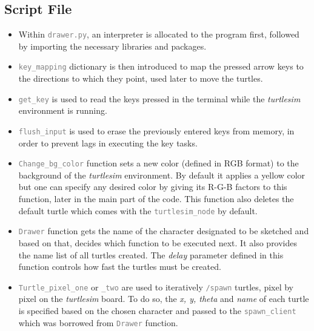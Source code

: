 \documentclass[conference]{IEEEtran}
\newcommand{\command}[1]{\textcolor{gray}{\footnotesize \texttt{#1}}}
\begin{document}
\subsection{Script File}
\begin{itemize}
    \item Within \command{drawer.py}, an interpreter is allocated to the program first, followed by importing the necessary libraries and packages.
    \item \command{key\_mapping} dictionary is then introduced to map the pressed arrow keys to the directions to which they point, used later to move the turtles.
    \item \command{get\_key} is used to read the keys pressed in the terminal while the \textit{turtlesim} environment is running.
    \item \command{flush\_input} is used to erase the previously entered keys from memory, in order to prevent lags in executing the key tasks.
    \item \command{Change\_bg\_color} function sets a new color (defined in RGB format) to the background of the \textit{turtlesim} environment. By default it applies a yellow color but one can specify any desired color by giving its R-G-B factors to this function, later in the main part of the code. This function also deletes the default turtle which comes with the \command{turtlesim\_node} by default.
    \item  \command{Drawer} function gets the name of the character designated to be sketched and based on that, decides which function to be executed next. It also provides the name list of all turtles created. The \textit{delay} parameter defined in this function controls how fast the turtles must be created.
    \item \command{Turtle\_pixel\_one} or \command{\_two} are used to iteratively \command{/spawn} turtles, pixel by pixel on the \textit{turtlesim} board. To do so, the \textit{x, y, theta} and \textit{name} of each turtle is specified based on the chosen character and passed to the \command{spawn\_client} which was borrowed from \command{Drawer} function.

\end{itemize}
\end{document}
